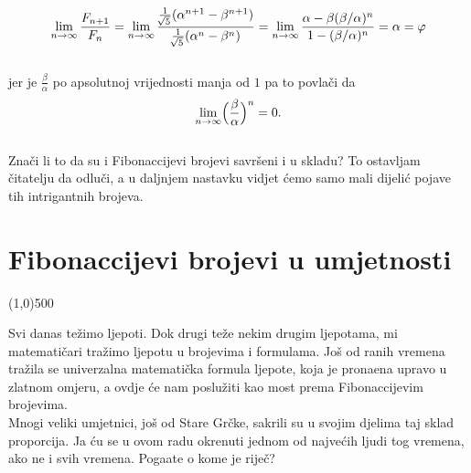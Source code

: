 \documentclass[14pt]{scrartcl}
\newcommand{\divfibo}[1]{\frac{#1}{F\sb{n}}}
\begin{document}
\begin{equation}
\lim_{n\to\infty}\divfibo{F\sb{n+1}}=\lim_{n\to\infty}\frac{\frac{1}{\sqrt[]{5}}(\alpha\sp{n+1}-\beta\sp{n+1})}{\frac{1}{\sqrt[]{5}}(\alpha\sp{n}-\beta\sp{n})}=\lim_{n\to\infty}\frac{\alpha-\beta(\beta/\alpha)\sp{n}}{1-(\beta/\alpha)\sp{n}}=\alpha=\varphi
\end{equation}
\\jer je $\frac{\beta}{\alpha}$ po apsolutnoj vrijednosti manja od $1$ pa to povla\v{c}i da
\begin{equation}
\lim_{n\to\infty}\Bigl(\frac{\beta}{\alpha}\Bigr)\sp{n}=0. \notag
\end{equation}
\\
Zna\v{c}i li to da su i Fibonaccijevi brojevi savr\v{s}eni i u skladu? To ostavljam \v{c}itatelju da odlu\v{c}i, a u daljnjem nastavku vidjet \'{c}emo samo mali dijeli\'{c} pojave tih intrigantnih brojeva.

\newpage
\section{Fibonaccijevi brojevi u umjetnosti}
\line(1,0){500}
\vspace{10mm}

Svi danas te\v{z}imo ljepoti. Dok drugi te\v{z}e nekim drugim ljepotama, mi matemati\v{c}ari tra\v{z}imo ljepotu u brojevima i formulama. Jo\v{s} od ranih vremena tra\v{z}ila se univerzalna matemati\v{c}ka formula ljepote, koja je prona\dj{}ena upravo u zlatnom omjeru, a ovdje  \'{c}e nam poslu\v{z}iti kao most prema Fibonaccijevim brojevima.
\\

Mnogi veliki umjetnici, još od Stare Gr\v{c}ke, sakrili su u svojim djelima taj sklad proporcija.
Ja \'{c}u se u ovom radu okrenuti jednom od najve\'{c}ih ljudi tog vremena, ako ne i svih vremena. 
Poga\dj{}ate o kome je rije\v{c}?\\
\end{document}
